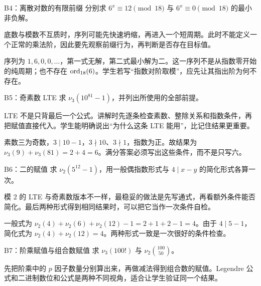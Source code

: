 \begin{problem}{B4：离散对数的有限前缀}
分别求 $6^x\equiv12\pmod{18}$ 与 $6^x\equiv0\pmod{18}$ 的最小非负解。
\end{problem}

\begin{pitfall}[讲解：先看这题到底在做什么]
底数与模数不互质时，序列可能先快速坍缩，再进入一个短周期。此时不能定义一个正常的乘法阶，因此要先观察前缀行为，再判断是否存在目标值。
\end{pitfall}

\sol 序列为 $1,6,0,0,\ldots$，第一式无解，第二式最小解为二。这一序列不是从指数零开始的纯周期；也不存在 $\operatorname{ord}_{18}(6)$。学生若写“指数对阶取模”，应先让其指出阶为何不存在。


\begin{problem}{B5：奇素数 LTE}
求 $\nu_3(10^{81}-1)$，并列出所使用的全部前提。
\end{problem}

\begin{pitfall}[讲解：先看这题到底在做什么]
LTE 不是只背最后一个公式。讲解时先逐条检查素数、整除关系和指数条件，再把赋值直接代入。学生能明确说出“为什么这条 LTE 能用”，比记住结果更重要。
\end{pitfall}

\sol 素数三为奇数，$3\mid10-1$，$3\nmid10$、$3\nmid1$，指数为正。故结果为 $\nu_3(9)+\nu_3(81)=2+4=6$。满分答案必须写出这些条件，而不是只写六。


\begin{problem}{B6：二的赋值}
求 $\nu_2(5^{12}-1)$，用一般偶指数形式与 $4\mid x-y$ 的简化形式各算一次。
\end{problem}

\begin{pitfall}[讲解：先看这题到底在做什么]
模 $2$ 的 LTE 与奇素数版本不一样，最稳妥的做法是先写通式，再看额外条件能否简化。最后两种形式得到相同结果时，可以把它当作一次条件自检。
\end{pitfall}

\sol 一般式为 $\nu_2(4)+\nu_2(6)+\nu_2(12)-1=2+1+2-1=4$。由于 $4\mid5-1$，简化式为 $\nu_2(4)+\nu_2(12)=4$。两种形式一致是一次很好的条件检查。


\begin{problem}{B7：阶乘赋值与组合数赋值}
求 $\nu_3(100!)$ 与 $\nu_2\binom{100}{50}$。
\end{problem}

\begin{pitfall}[讲解：先看这题到底在做什么]
先把阶乘中的 $p$ 因子数量分别算出来，再做减法得到组合数的赋值。Legendre 公式和二进制数位和公式是两种不同视角，适合让学生验证同一个结果。
\end{pitfall}

